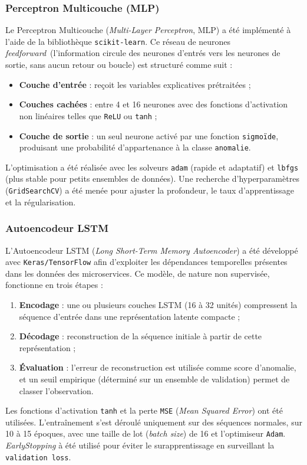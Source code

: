 \documentclass[conference]{IEEEtran}
\begin{document}
\subsubsection{Perceptron Multicouche (MLP)}
Le Perceptron Multicouche (\textit{Multi-Layer Perceptron}, MLP) a été implémenté à l’aide de la bibliothèque \texttt{scikit-learn}.  
Ce réseau de neurones \textit{feedforward}~(l'information circule des neurones d'entrés vers les neurones de sortie, sans aucun retour ou boucle) est structuré comme suit :
\begin{itemize}
    \item \textbf{Couche d’entrée} : reçoit les variables explicatives prétraitées ;
    \item \textbf{Couches cachées} : entre 4 et 16 neurones avec des fonctions d’activation non linéaires telles que \texttt{ReLU} ou \texttt{tanh} ;
    \item \textbf{Couche de sortie} : un seul neurone activé par une fonction \texttt{sigmoïde}, produisant une probabilité d’appartenance à la classe \texttt{anomalie}.
\end{itemize}
L’optimisation a été réalisée avec les solveurs \texttt{adam} (rapide et adaptatif) et \texttt{lbfgs} (plus stable pour petits ensembles de données).  
Une recherche d’hyperparamètres (\texttt{GridSearchCV}) a été menée pour ajuster la profondeur, le taux d’apprentissage et la régularisation.  

\subsubsection{Autoencodeur LSTM}
L’Autoencodeur LSTM (\textit{Long Short-Term Memory Autoencoder}) a été développé avec \texttt{Keras/TensorFlow} afin d’exploiter les dépendances temporelles présentes dans les données des microservices.
Ce modèle, de nature non supervisée, fonctionne en trois étapes :
\begin{enumerate}
    \item \textbf{Encodage} : une ou plusieurs couches LSTM (16 à 32 unités) compressent la séquence d’entrée dans une représentation latente compacte ;
    \item \textbf{Décodage} : reconstruction de la séquence initiale à partir de cette représentation ;
    \item \textbf{Évaluation} : l’erreur de reconstruction est utilisée comme score d’anomalie, et un seuil empirique (déterminé sur un ensemble de validation) permet de classer l’observation.
\end{enumerate}
Les fonctions d’activation \texttt{tanh} et la perte \texttt{MSE} (\textit{Mean Squared Error}) ont été utilisées.  
L’entraînement s’est déroulé uniquement sur des séquences normales, sur 10 à 15 époques, avec une taille de lot (\textit{batch size}) de 16 et l’optimiseur \texttt{Adam}. \textit{EarlyStopping} à été utilisé pour éviter le surapprentissage en surveillant la \texttt{validation loss}.
\end{document}

